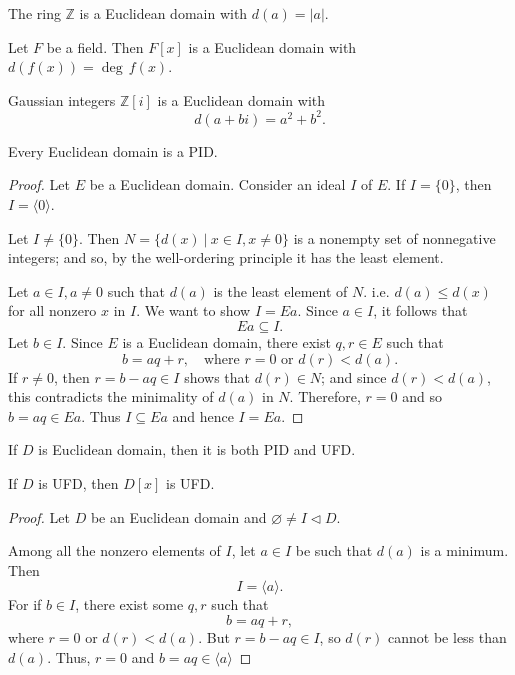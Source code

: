 \begin{example}
    The ring $\mathbb{Z}$ is a Euclidean domain with $d(a) = |a|$.
\end{example}

\begin{example}
    Let $F$ be a field. Then $F[x]$ is a Euclidean domain with $d(f(x)) = \deg\, f(x)$.
\end{example}

\begin{example}
    Gaussian integers $\mathbb{Z}[i]$ is a Euclidean domain with
    \[
        d(a+bi) = a^2 + b^2.
    \]
\end{example}

\begin{theorem}
    Every Euclidean domain is a PID.
\end{theorem}
\begin{proof}
    Let $E$ be a Euclidean domain. Consider an ideal $I$ of $E$. If $I = \{ 0 \}$, then 
    $I = \langle 0 \rangle$.

    Let $I \neq \{ 0 \}$. Then $N = \{ d(x) \> | \> x \in I, x \neq 0 \}$ is a nonempty 
    set of nonnegative integers; and so, by the well-ordering principle 
    it has the least element.

    Let $a \in I, a \neq 0$ such that $d(a)$ is the least element of $N$. i.e. $d(a) \leq d(x)$ for all 
    nonzero $x$ in $I$. We want to show $I = Ea$. Since $a \in I$, it follows that 
    \[
        Ea \subseteq I.
    \]
    Let $b \in I$. Since $E$ is a Euclidean domain, there exist $q, r \in E$ such that 
    \[
        b = aq+r, \quad \text{where } r = 0 \text{ or } d(r) < d(a).
    \]
    If $r \neq 0$, then $r = b - aq \in I$ shows that $d(r) \in N$; and since 
    $d(r) < d(a)$, this contradicts the minimality of $d(a)$ in $N$. Therefore, $r = 0$ and so $b = aq \in Ea$.
    Thus $I \subseteq Ea$ and hence $I = Ea$.
\end{proof}

\begin{remark}
    If $D$ is Euclidean domain, then it is both PID and UFD.
\end{remark}

\begin{theorem}
    If $D$ is UFD, then $D[x]$ is UFD.
\end{theorem}
\begin{proof}
    Let $D$ be an Euclidean domain and $\varnothing \neq I \triangleleft D$.

    Among all the nonzero elements of $I$, let $a \in I$ be such that $d(a)$ is a minimum. 
    Then
    \[
        I = \langle a \rangle.
    \]
    For if $b \in I$, there exist some $q,r$ such that 
    \[
        b = aq+r,
    \]
    where $r=0$ or $d(r) < d(a)$. But $r = b-aq \in I$, so $d(r)$ cannot be less than $d(a)$. 
    Thus, $r = 0$ and $b = aq \in \langle a \rangle$
\end{proof}


